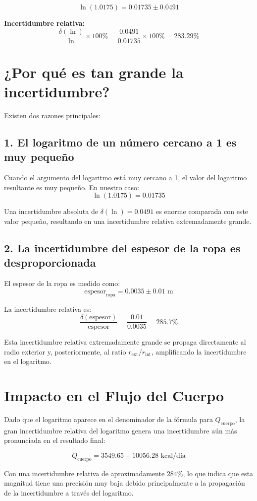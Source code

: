 \documentclass[12pt]{article}
\begin{document}
\[
\ln(1.0175) = 0.01735 \pm 0.0491
\]

\textbf{Incertidumbre relativa:} 
\[
\frac{\delta(\ln)}{\ln} \times 100\% = \frac{0.0491}{0.01735} \times 100\% = 283.29\%
\]

\section*{¿Por qué es tan grande la incertidumbre?}

Existen dos razones principales:

\subsection*{1. El logaritmo de un número cercano a 1 es muy pequeño}

Cuando el argumento del logaritmo está muy cercano a 1, el valor del logaritmo resultante es muy pequeño. En nuestro caso:
\[
\ln(1.0175) = 0.01735
\]

Una incertidumbre absoluta de $\delta(\ln) = 0.0491$ es enorme comparada con este valor pequeño, resultando en una incertidumbre relativa extremadamente grande.

\subsection*{2. La incertidumbre del espesor de la ropa es desproporcionada}

El espesor de la ropa es medido como:
\[
\text{espesor}_{\text{ropa}} = 0.0035 \pm 0.01 \text{ m}
\]

La incertidumbre relativa es:
\[
\frac{\delta(\text{espesor})}{\text{espesor}} = \frac{0.01}{0.0035} = 285.7\%
\]

Esta incertidumbre relativa extremadamente grande se propaga directamente al radio exterior y, posteriormente, al ratio $r_{\text{ext}}/r_{\text{int}}$, amplificando la incertidumbre en el logaritmo.

\section*{Impacto en el Flujo del Cuerpo}

Dado que el logaritmo aparece en el denominador de la fórmula para $Q_{\text{cuerpo}}$, la gran incertidumbre relativa del logaritmo genera una incertidumbre aún más pronunciada en el resultado final:

\[
Q_{\text{cuerpo}} = 3549.65 \pm 10056.28 \text{ kcal/día}
\]

Con una incertidumbre relativa de aproximadamente $284\%$, lo que indica que esta magnitud tiene una precisión muy baja debido principalmente a la propagación de la incertidumbre a través del logaritmo.
\end{document}

